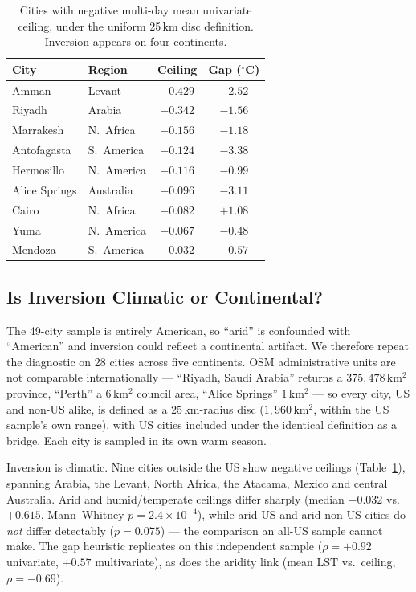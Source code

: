 \documentclass[conference]{IEEEtran}
\begin{document}
\begin{table}[ht]
  \centering
  \caption{Cities with negative multi-day mean univariate ceiling, under the
  uniform 25\,km disc definition. Inversion appears on four continents.}
  \label{tab:arid}
  \scriptsize
  \begin{tabular}{llcc}
    \toprule
    City & Region & Ceiling & Gap ($^{\circ}$C) \\
    \midrule
    Amman & Levant & $-0.429$ & $-2.52$ \\
    Riyadh & Arabia & $-0.342$ & $-1.56$ \\
    Marrakesh & N.~Africa & $-0.156$ & $-1.18$ \\
    Antofagasta & S.~America & $-0.124$ & $-3.38$ \\
    Hermosillo & N.~America & $-0.116$ & $-0.99$ \\
    Alice Springs & Australia & $-0.096$ & $-3.11$ \\
    Cairo & N.~Africa & $-0.082$ & $+1.08$ \\
    Yuma & N.~America & $-0.067$ & $-0.48$ \\
    Mendoza & S.~America & $-0.032$ & $-0.57$ \\
    \bottomrule
  \end{tabular}
\end{table}

\subsection{Is Inversion Climatic or Continental?}
The 49-city sample is entirely American, so ``arid'' is confounded with
``American'' and inversion could reflect a continental artifact. We
therefore repeat the diagnostic on 28 cities across five continents. OSM
administrative units are not comparable internationally --- ``Riyadh,
Saudi Arabia'' returns a $375{,}478$\,km$^2$ province, ``Perth'' a
$6$\,km$^2$ council area, ``Alice Springs'' $1$\,km$^2$ --- so every
city, US and non-US alike, is defined as a $25$\,km-radius disc
($1{,}960$\,km$^2$, within the US sample's own range), with US cities
included under the identical definition as a bridge. Each city is sampled
in its own warm season.

Inversion is climatic. Nine cities outside the US show negative ceilings
(Table~\ref{tab:arid}), spanning Arabia, the Levant, North Africa, the
Atacama, Mexico and central Australia. Arid and humid/temperate ceilings
differ sharply (median $-0.032$ vs.\ $+0.615$, Mann--Whitney
$p{=}2.4{\times}10^{-4}$), while arid US and arid non-US cities do
\emph{not} differ detectably ($p{=}0.075$) --- the comparison an all-US
sample cannot make. The gap heuristic replicates on this independent
sample ($\rho{=}{+}0.92$ univariate, $+0.57$ multivariate), as does the
aridity link (mean LST vs.\ ceiling, $\rho{=}{-}0.69$).
\end{document}
